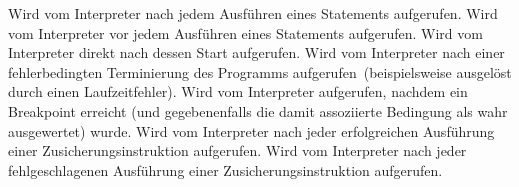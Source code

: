 \begin{description}
    Wird vom Interpreter nach jedem Ausführen eines Statements aufgerufen.
    Wird vom Interpreter vor jedem Ausführen eines Statements aufgerufen.
    Wird vom Interpreter direkt nach dessen Start aufgerufen.
    Wird vom Interpreter nach einer fehlerbedingten Terminierung des Programms aufgerufen~(beispielsweise ausgelöst durch einen Laufzeitfehler).
    Wird vom Interpreter aufgerufen, nachdem ein Breakpoint erreicht (und gegebenenfalls die damit assoziierte Bedingung als wahr ausgewertet) wurde.
    Wird vom Interpreter nach jeder erfolgreichen Ausführung einer Zusicherungsinstruktion aufgerufen.
    Wird vom Interpreter nach jeder fehlgeschlagenen Ausführung einer Zusicherungsinstruktion aufgerufen.
\end{description}
